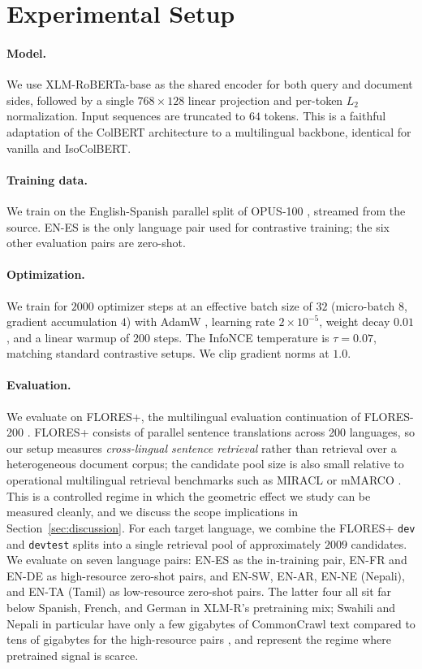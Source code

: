 \section{Experimental Setup}
\label{sec:setup}

\paragraph{Model.} We use XLM-RoBERTa-base \citep{conneau2020xlmr} as the shared encoder for both query and document sides, followed by a single $768 \times 128$ linear projection and per-token $L_2$ normalization. Input sequences are truncated to $64$ tokens. This is a faithful adaptation of the ColBERT architecture to a multilingual backbone, identical for vanilla and IsoColBERT.

\paragraph{Training data.} We train on the English-Spanish parallel split of OPUS-100 \citep{zhang2020opus100}, streamed from the source. EN-ES is the only language pair used for contrastive training; the six other evaluation pairs are zero-shot.

\paragraph{Optimization.} We train for $2000$ optimizer steps at an effective batch size of $32$ (micro-batch $8$, gradient accumulation $4$) with AdamW \citep{loshchilov2019adamw}, learning rate $2 \times 10^{-5}$, weight decay $0.01$, and a linear warmup of $200$ steps. The InfoNCE temperature is $\tau = 0.07$, matching standard contrastive setups. We clip gradient norms at $1.0$.

\paragraph{Evaluation.} We evaluate on FLORES+, the multilingual evaluation continuation of FLORES-200 \citep{nllb2024flores}. FLORES+ consists of parallel sentence translations across 200 languages, so our setup measures \emph{cross-lingual sentence retrieval} rather than retrieval over a heterogeneous document corpus; the candidate pool size is also small relative to operational multilingual retrieval benchmarks such as MIRACL \citep{zhang2023miracl} or mMARCO \citep{bonifacio2021mmarco}. This is a controlled regime in which the geometric effect we study can be measured cleanly, and we discuss the scope implications in Section~\ref{sec:discussion}. For each target language, we combine the FLORES+ \texttt{dev} and \texttt{devtest} splits into a single retrieval pool of approximately $2009$ candidates. We evaluate on seven language pairs: EN-ES as the in-training pair, EN-FR and EN-DE as high-resource zero-shot pairs, and EN-SW, EN-AR, EN-NE (Nepali), and EN-TA (Tamil) as low-resource zero-shot pairs. The latter four all sit far below Spanish, French, and German in XLM-R's pretraining mix; Swahili and Nepali in particular have only a few gigabytes of CommonCrawl text compared to tens of gigabytes for the high-resource pairs \citep{conneau2020xlmr}, and represent the regime where pretrained signal is scarce.

